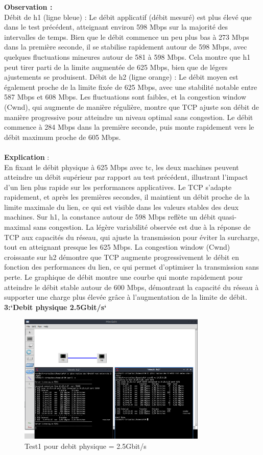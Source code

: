 \textbf{Observation :}\\
Débit de h1 (ligne bleue) :  Le débit applicatif (débit mesuré) est plus élevé que dans le test précédent, atteignant environ 598 Mbps sur la majorité des intervalles de temps. Bien que le débit commence un peu plus bas à 273 Mbps dans la première seconde, il se stabilise rapidement autour de 598 Mbps, avec quelques fluctuations mineures autour de 581 à 598 Mbps. Cela montre que h1 peut tirer parti de la limite augmentée de 625 Mbps, bien que de légers ajustements se produisent.
Débit de h2 (ligne orange) : Le débit moyen est également proche de la limite fixée de 625 Mbps, avec une stabilité notable entre 587 Mbps et 608 Mbps. Les fluctuations sont faibles, et la congestion window (Cwnd), qui augmente de manière régulière, montre que TCP ajuste son débit de manière progressive pour atteindre un niveau optimal sans congestion. Le débit commence à 284 Mbps dans la première seconde, puis monte rapidement vers le débit maximum proche de 605 Mbps.
\\
\\
\textbf{Explication} :\\
En fixant le débit physique à 625 Mbps avec tc, les deux machines peuvent atteindre un débit supérieur par rapport au test précédent, illustrant l'impact d'un lien plus rapide sur les performances applicatives. Le TCP s’adapte rapidement, et après les premières secondes, il maintient un débit proche de la limite maximale du lien, ce qui est visible dans les valeurs stables des deux machines. Sur h1, la constance autour de 598 Mbps reflète un débit quasi-maximal sans congestion. La légère variabilité observée est due à la réponse de TCP aux capacités du réseau, qui ajuste la transmission pour éviter la surcharge, tout en atteignant presque les 625 Mbps. La congestion window (Cwnd) croissante sur h2 démontre que TCP augmente progressivement le débit en fonction des performances du lien, ce qui permet d’optimiser la transmission sans perte. Le graphique de débit montre une courbe qui monte rapidement pour atteindre le débit stable autour de 600 Mbps, démontrant la capacité du réseau à supporter une charge plus élevée grâce à l’augmentation de la limite de débit.
\vspace{1cm}
\\
\textbf{3:`Debit physique 2.5Gbit/s`} 
\begin{figure}[H]
    \centering
    \includegraphics[width=0.8\textwidth]{./images/T1.1/2500test1.png}
    \caption{Test1 pour debit physique = 2.5Gbit/s}
    \label{fig:exemple}
\end{figure}
